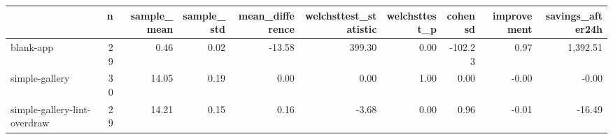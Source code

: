 \begin{tabular}{lrrrrrrrrr}
\toprule
{} &   n &  sample\_mean &  sample\_std &  mean\_difference &  welchsttest\_statistic &  welchsttest\_p &  cohensd &  improvement &  savings\_after24h \\
\midrule
blank-app                    &  29 &         0.46 &        0.02 &           -13.58 &                 399.30 &           0.00 &  -102.23 &         0.97 &          1,392.51 \\
simple-gallery               &  30 &        14.05 &        0.19 &             0.00 &                   0.00 &           1.00 &     0.00 &        -0.00 &             -0.00 \\
simple-gallery-lint-overdraw &  29 &        14.21 &        0.15 &             0.16 &                  -3.68 &           0.00 &     0.96 &        -0.01 &            -16.49 \\
\bottomrule
\end{tabular}
